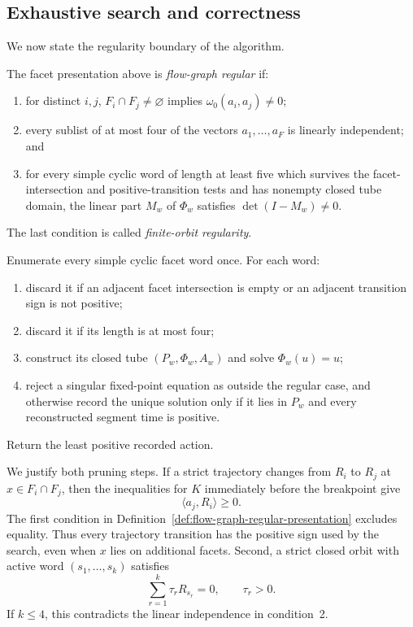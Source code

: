 \FloatBarrier
\subsection{Exhaustive search and correctness}
\label{subsec:flow-graph-algorithm-ch2021-correctness}

We now state the regularity boundary of the algorithm.

\begin{definition}
\label{def:flow-graph-regular-presentation}
The facet presentation above is \emph{flow-graph regular} if:
\begin{enumerate}
  \item for distinct \(i,j\),
    \(F_i\cap F_j\ne\varnothing\) implies
    \(\omega_0(a_i,a_j)\ne0\);
  \item every sublist of at most four of the vectors
    \(a_1,\ldots,a_F\) is linearly independent; and
  \item for every simple cyclic word of length at least five which survives
    the facet-intersection and positive-transition tests and has nonempty
    closed tube domain, the linear part \(M_w\) of \(\Phi_w\) satisfies
    \(\det(I-M_w)\ne0\).
\end{enumerate}
The last condition is called \emph{finite-orbit regularity}.
\end{definition}

\begin{algorithm}
\label{alg:idealized-exhaustive-flow-graph-search}
Enumerate every simple cyclic facet word once.  For each word:
\begin{enumerate}
  \item discard it if an adjacent facet intersection is empty or an adjacent
    transition sign is not positive;
  \item discard it if its length is at most four;
  \item construct its closed tube \((P_w,\Phi_w,A_w)\) and solve
    \(\Phi_w(u)=u\);
  \item reject a singular fixed-point equation as outside the regular case,
    and otherwise record the unique solution only if it lies in \(P_w\) and
    every reconstructed segment time is positive.
\end{enumerate}
Return the least positive recorded action.
\end{algorithm}

We justify both pruning steps.  If a strict trajectory changes from \(R_i\) to
\(R_j\) at \(x\in F_i\cap F_j\), then the inequalities
for \(K\) immediately before the breakpoint give
\[
  \langle a_j,R_i\rangle\geq0.
\]
The first condition in
Definition~\ref{def:flow-graph-regular-presentation} excludes equality.  Thus
every trajectory transition has the positive sign used by the search, even
when \(x\) lies on additional facets.  Second, a strict closed orbit with
active word \((s_1,\ldots,s_k)\) satisfies
\[
  \sum_{r=1}^k\tau_rR_{s_r}=0,
  \qquad \tau_r>0.
\]
If \(k\leq4\), this contradicts the linear independence in condition~2.

